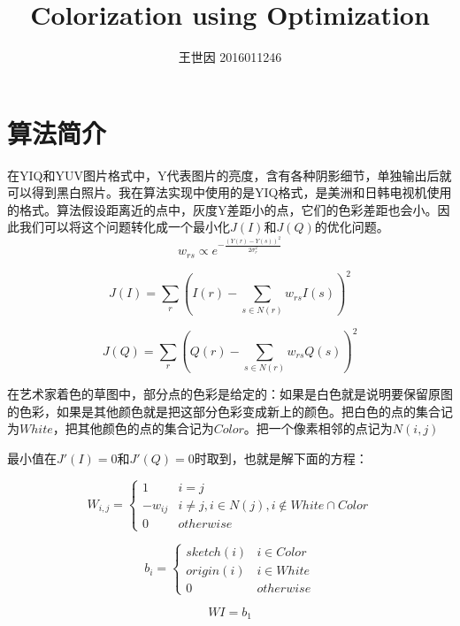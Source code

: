 \documentclass{article}
\title{Colorization using Optimization}
\author{王世因 2016011246}
\date{}
\begin{document}
\maketitle

\tableofcontents
\newpage

\section{算法简介}
在YIQ和YUV图片格式中，Y代表图片的亮度，含有各种阴影细节，单独输出后就可以得到黑白照片。我在算法实现中使用的是YIQ格式，是美洲和日韩电视机使用的格式。算法假设距离近的点中，灰度Y差距小的点，它们的色彩差距也会小。因此我们可以将这个问题转化成一个最小化$J(I)$和$J(Q)$的优化问题。
\begin{equation}
w_{rs} \propto e^{-\frac{(Y(r)-Y(s))^2}{2\sigma_r^2}}
\end{equation}


\begin{equation}
J(I) = \sum_r (I(r)-\sum_{s\in N(r)} w_{rs} I(s))^2
\end{equation}

\begin{equation}
J(Q) = \sum_r (Q(r)-\sum_{s\in N(r)} w_{rs} Q(s))^2
\end{equation}

在艺术家着色的草图中，部分点的色彩是给定的：如果是白色就是说明要保留原图的色彩，如果是其他颜色就是把这部分色彩变成新上的颜色。把白色的点的集合记为$White$，把其他颜色的点的集合记为$Color$。把一个像素相邻的点记为$N(i, j)$

最小值在$J'(I)=0$和$J'(Q)=0$时取到，也就是解下面的方程：

\begin{equation}
W_{i, j} = \left\{
\begin{array}{cc}
1 & i=j\\
-w_{ij} & i\neq j, i\in N(j), i\notin White \cap Color\\
0 & otherwise
\end{array}
\right.
\end{equation}

\begin{equation}
b_i= \left\{
\begin{array}{cc}
sketch(i) & i\in Color\\
origin(i) & i\in White\\
0 & otherwise
\end{array}
\right.
\end{equation}

\begin{equation}
WI = b_1
\end{equation}
\end{document}

